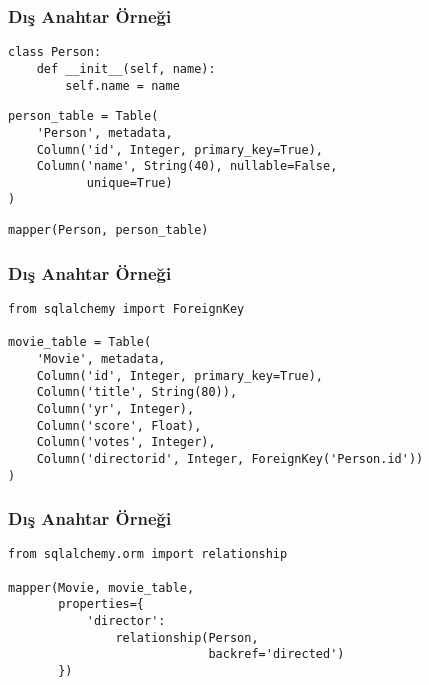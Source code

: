\documentclass[dvipsnames]{beamer}
\theoremstyle{plain}
\begin{document}
\begin{frame}[fragile]
  \frametitle{Dış Anahtar Örneği}

  \begin{lstlisting}
class Person:
    def __init__(self, name):
        self.name = name
  \end{lstlisting}

  \begin{lstlisting}
person_table = Table(
    'Person', metadata,
    Column('id', Integer, primary_key=True),
    Column('name', String(40), nullable=False,
           unique=True)
)
  \end{lstlisting}

  \begin{lstlisting}
mapper(Person, person_table)
  \end{lstlisting}
\end{frame}

\begin{frame}[fragile]
  \frametitle{Dış Anahtar Örneği}

  \begin{lstlisting}
from sqlalchemy import ForeignKey

movie_table = Table(
    'Movie', metadata,
    Column('id', Integer, primary_key=True),
    Column('title', String(80)),
    Column('yr', Integer),
    Column('score', Float),
    Column('votes', Integer),
    Column('directorid', Integer, ForeignKey('Person.id'))
)
  \end{lstlisting}
\end{frame}

\begin{frame}[fragile]
  \frametitle{Dış Anahtar Örneği}

  \begin{lstlisting}
from sqlalchemy.orm import relationship

mapper(Movie, movie_table,
       properties={
           'director':
               relationship(Person,
                            backref='directed')
       })
  \end{lstlisting}
\end{frame}

%
%
%
%
\end{document}
